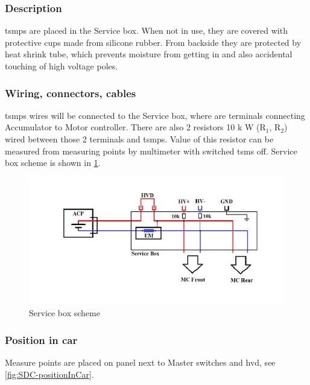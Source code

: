 \subsubsection{Description}

\Glspl{tsmp} are placed in the Service box. When not in use, they are covered with protective cups made from silicone rubber. From backside they are protected by heat shrink tube, which prevents moisture from getting in and also accidental touching of high voltage poles.

\subsubsection{Wiring, connectors, cables}

\Glspl{tsmp} wires will be connected to the Service box, where are terminals connecting Accumulator to Motor controller. There are also 2 resistors 10 k W (R$_1$, R$_2$) wired between those 2 terminals and \glspl{tsmp}. Value of this resistor can be measured from measuring points by multimeter with switched \gls{tsms} off. Service box scheme is shown in \ref{fig:ServiceBox/scheme}.

\begin{figure}[H]
	\includegraphics[width=\textwidth]{./img/ServiceBox-scheme.jpg}
	\caption{Service box scheme}
	\label{fig:ServiceBox/scheme}
\end{figure}

\subsubsection{Position in car}

Measure points are placed on panel next to Master switches and \gls{hvd}, see \ref{fig:SDC-positionInCar}.